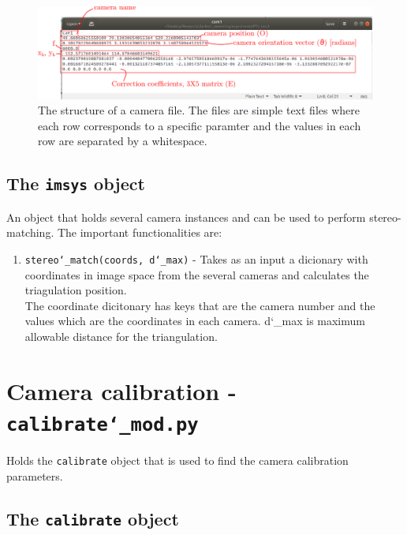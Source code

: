 \documentclass[10pt,a4paper]{article}
\begin{document}
\begin{figure}
	\centering
	\includegraphics[width=\textwidth]{camera_files.pdf}
	\caption{The structure of a camera file. The files are simple text files where each row corresponds to a specific paramter and the values in each row are separated by a whitespace. \label{fig:camfiles}}
\end{figure}








\subsection{The \texttt{imsys} object}


An object that holds several camera instances and can be used to perform stereo-matching. The important functionalities are:


\begin{enumerate}
	\item \texttt{stereo\char`_match(coords, d\char`_max)} - Takes as an input a dicionary with coordinates in image space from the several cameras and calculates the triagulation position. \\ The coordinate dicitonary has keys that are the camera number and the values which are the coordinates in each camera. d\char`_max is maximum allowable distance for the triangulation.
	
\end{enumerate}








\section{Camera calibration - \texttt{calibrate\char`_mod.py}}


Holds the \texttt{calibrate} object that is used to find the camera calibration parameters.



\subsection{The \texttt{calibrate} object}
\end{document}
